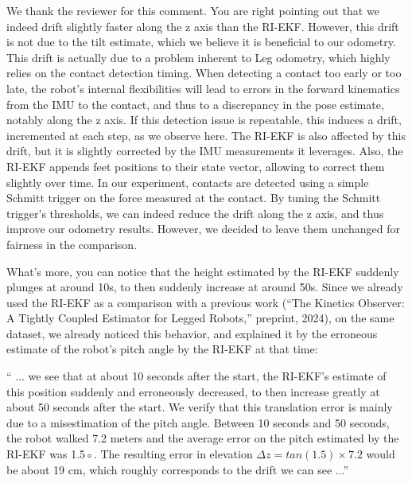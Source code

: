 We thank the reviewer for this comment. You are right pointing out that we indeed drift slightly faster along the z axis than the RI-EKF.
However, this drift is not due to the tilt estimate, which we believe it is beneficial to our odometry. 
This drift is actually due to a problem inherent to Leg odometry, which highly relies on the contact detection timing. When detecting a contact too early or too late, the robot's internal flexibilities will lead to errors in the forward kinematics from the IMU to the contact, and thus to a discrepancy in the pose estimate, notably along the z axis. If this detection issue is repeatable, this induces a drift, incremented at each step, as we observe here.
The RI-EKF is also affected by this drift, but it is slightly corrected by the IMU measurements it leverages. Also, the RI-EKF appends feet positions to their state vector, allowing to correct them slightly over time. In our experiment, contacts are detected using a simple Schmitt trigger on the force measured at the contact. By tuning the Schmitt trigger's thresholds, we can indeed reduce the drift along the z axis, and thus improve our odometry results. However, we decided to leave them unchanged for fairness in the comparison. 


What's more, you can notice that the height estimated by the RI-EKF suddenly plunges at around 10s, to then suddenly increase at around 50s. Since we already used the RI-EKF as a comparison with a previous work (“The Kinetics Observer: A Tightly Coupled Estimator for Legged Robots,” preprint, 2024), on the same dataset, we already noticed this behavior, and explained it by the erroneous estimate of the robot's pitch angle by the RI-EKF at that time:

\begin{quotepaper}
`` ... we see that at about 10 seconds after
the start, the RI-EKF’s estimate of this position suddenly and
erroneously decreased, to then increase greatly at about 50
seconds after the start. We verify that this translation error is
mainly due to a misestimation of the pitch angle. Between
10 seconds and 50 seconds, the robot walked 7.2 meters and
the average error on the pitch estimated by the RI-EKF was
1.5◦. The resulting error in elevation $\Delta z = tan(1.5) \times 7.2$
would be about 19 cm, which roughly corresponds to the drift we can see ...''
\end{quotepaper}


